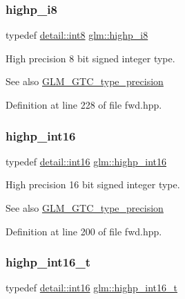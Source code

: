 \subsubsection{\texorpdfstring{highp\_i8}{highp\_i8}}
{\footnotesize\ttfamily typedef \mbox{\hyperlink{namespaceglm_1_1detail_a04b526a8d7a9b455602a0afa78c531e0}{detail\+::int8}} \mbox{\hyperlink{group__gtc__type__precision_ga8b9eb0b24cce7f14478bfcacb53ce839}{glm\+::highp\+\_\+i8}}}

High precision 8 bit signed integer type. \begin{DoxySeeAlso}{See also}
\mbox{\hyperlink{group__gtc__type__precision}{G\+L\+M\+\_\+\+G\+T\+C\+\_\+type\+\_\+precision}} 
\end{DoxySeeAlso}


Definition at line 228 of file fwd.\+hpp.

\mbox{\label{group__gtc__type__precision_gaf0430ed80e88c0d1dfbe47f359659c81}} 
\subsubsection{\texorpdfstring{highp\_int16}{highp\_int16}}
{\footnotesize\ttfamily typedef \mbox{\hyperlink{namespaceglm_1_1detail_a375938874ca4f0a0982ec6373b56117b}{detail\+::int16}} \mbox{\hyperlink{group__gtc__type__precision_gaf0430ed80e88c0d1dfbe47f359659c81}{glm\+::highp\+\_\+int16}}}

High precision 16 bit signed integer type. \begin{DoxySeeAlso}{See also}
\mbox{\hyperlink{group__gtc__type__precision}{G\+L\+M\+\_\+\+G\+T\+C\+\_\+type\+\_\+precision}} 
\end{DoxySeeAlso}


Definition at line 200 of file fwd.\+hpp.

\mbox{\label{group__gtc__type__precision_ga07d318d61472e75238e53b9642227672}} 
\subsubsection{\texorpdfstring{highp\_int16\_t}{highp\_int16\_t}}
{\footnotesize\ttfamily typedef \mbox{\hyperlink{namespaceglm_1_1detail_a375938874ca4f0a0982ec6373b56117b}{detail\+::int16}} \mbox{\hyperlink{group__gtc__type__precision_ga07d318d61472e75238e53b9642227672}{glm\+::highp\+\_\+int16\+\_\+t}}}

